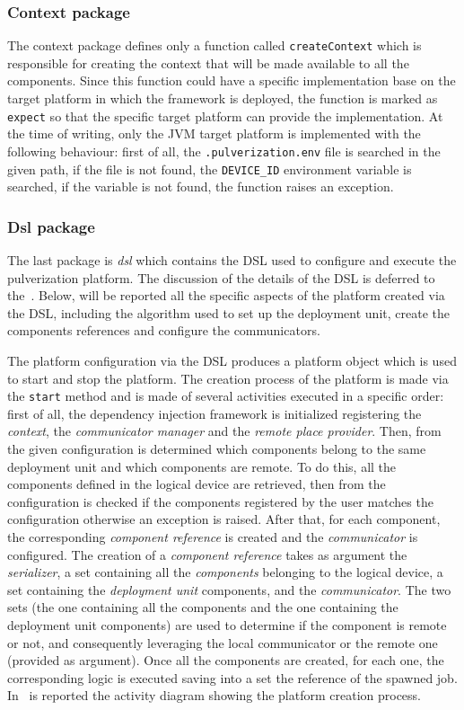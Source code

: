 \subsubsection{Context package}

The context package defines only a function called \texttt{createContext} which is responsible for creating the context that will be made available to
all the components. Since this function could have a specific implementation base on the target platform in which the framework is deployed, the
function is marked as \texttt{expect} so that the specific target platform can provide the implementation. At the time of writing, only the JVM
target platform is implemented with the following behaviour: first of all, the \texttt{.pulverization.env} file is searched in the given path, if
the file is not found, the \texttt{DEVICE\_ID} environment variable is searched, if the variable is not found, the function raises an exception.

\subsubsection{Dsl package}

The last package is \emph{dsl} which contains the DSL used to configure and execute the pulverization platform. The discussion of the details of
the DSL is deferred to the~.
Below, will be reported all the specific aspects of the platform created via the DSL, including the algorithm used to set up the deployment unit,
create the components references and configure the communicators.

The platform configuration via the DSL produces a platform object which is used to start and stop the platform.
The creation process of the platform is made via the \texttt{start} method and is made of several activities executed in a specific order: first of
all, the dependency injection framework is initialized registering the \emph{context}, the \emph{communicator manager} and the
\emph{remote place provider}.
Then, from the given configuration is determined which components belong to the same deployment unit and which components are remote.
To do this, all the components defined in the logical device are retrieved, then from the configuration is checked if the components registered by
the user matches the configuration otherwise an exception is raised.
After that, for each component, the corresponding \emph{component reference} is created and the \emph{communicator} is configured.
The creation of a \emph{component reference} takes as argument the \emph{serializer}, a set containing all the \emph{components} belonging to
the logical device, a set containing the \emph{deployment unit} components, and the \emph{communicator}.
The two sets (the one containing all the components and the one containing the deployment unit components) are used to determine if
the component is remote or not, and consequently leveraging the local communicator or the remote one (provided as argument).
Once all the components are created, for each one, the corresponding logic is executed saving into a set the reference of the spawned job.
In~ is reported the activity diagram showing the platform creation process.

